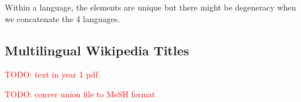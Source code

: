 \documentclass[a4paper,11pt]{article}
\newcommand{\red}[1]{\textcolor{red}{#1}}
\begin{document}
Within a language, the elements are unique but there might be degeneracy when we concatenate the 4 languages.

\subsection{Multilingual Wikipedia Titles}
\label{ss:wpLex}

\red{TODO: text in year 1 pdf.}

\red{TODO: conver union file to MeSH format}

\section{}
\label{s:}





%
%


\end{document}
